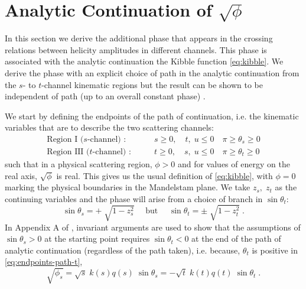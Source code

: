 \section{Analytic Continuation of \(\sqrt{\phi}\)} \label{app:anal-con}
In this section we derive the additional phase that appears in the crossing relations between helicity amplitudes in different channels. This phase is associated with the analytic continuation the Kibble function \cref{eq:kibble}. We derive the phase with an explicit choice of path in the analytic continuation from the \(s\)- to \(t\)-channel kinematic regions but the result can be shown to be independent of path (up to an overall constant phase) \cite{Trueman,FoxThesis,Brunet1966,Cohen-Tannoudji1968}.

We start by defining the endpoints of the path of continuation, i.e. the kinematic variables that are to describe the two scattering channels:
  \begin{subequations}
  \begin{align} \label{eq:endpoints-path-s}
    \text{Region I } (s \text{-channel) :}& \qquad s \geq 0, \quad t, \; u  \leq 0 \quad \pi \geq \theta_s \geq 0
    \\
    \label{eq:endpoints-path-t}
    \text{Region III } (t \text{-channel) :}& \qquad t \geq 0, \quad s, \; u \leq 0 \quad \pi \geq \theta_t \geq 0
  \end{align}
\end{subequations}
such that in a physical scattering region, \(\phi > 0\) and for values of energy on the real axis, \(\sqrt{\phi}\) is real. This gives us the usual definition of \cref{eq:kibble}, with \(\phi = 0\) marking the physical boundaries in the Mandelstam plane. We take \(z_s, \; z_t\) as the continuing variables and the phase will arise from a choice of branch in \(\sin\theta_t\):
  \begin{equation} \label{branch-choice}
    \sin\theta_s = + \;\sqrt{1 - z_s^2} \quad \text{ but } \quad \sin \theta_t = \pm \; \sqrt{1 - z_t^2} \; .
  \end{equation}
In Appendix A of \cite{Trueman}, invariant arguments are used to show that the assumptions of \(\sin\theta_s > 0\) at the starting point requires \(\sin\theta_t < 0\) at the end of the path of analytic continuation (regardless of the path taken), i.e. because, \( \theta_t\) is positive in \cref{eq:endpoints-path-t},
  \begin{equation}
    \label{eq:neg-sin}
    \sqrt{\phi_s} = \sqrt{s} \; k(s) q(s) \; \sin\theta_s = - \sqrt{t} \; k(t) q(t) \; \sin\theta_t \; .
  \end{equation}


